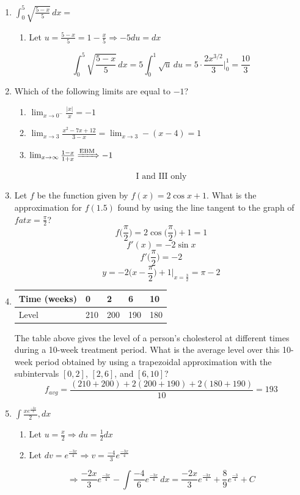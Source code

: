 \documentclass[12pt]{article}
\begin{document}
\begin{enumerate}
    \item $\int_0^5 \sqrt{\frac{5-x}{5}} \, dx = $
    \begin{enumerate}
        \item Let $u=\frac{5-x}{5} = 1-\frac{x}{5} \Longrightarrow -5du = dx$
    \end{enumerate}
    $$ \int_0^5 \sqrt{\frac{5-x}{5}} \, dx = 5\int_{0}^{1} \sqrt{u} \, du = 5 \cdot \frac{2x^{3/2}}{3} \bigg\rvert_{0}^{1} =\boxed{\frac{10}{3}}$$
    \item Which of the following limits are equal to $-1$?
        \begin{enumerate}[label=\Roman*.]
            \item $\lim_{x\to0^-} \frac{|x|}{x} = -1$
            \item $\lim_{x\to3} \frac{x^2-7x+12}{3-x} = \lim_{x\to3} - (x-4)=1 $
            \item $\lim_{x\to\infty} \frac{1-x}{1+x} \xRightarrow[]{\text{EBM}} -1$
        \end{enumerate}
        $$\boxed{\text{I and III only}}$$
    \item Let $f$ be the function given by $f(x) = 2\cos x + 1$. What is the approximation for $f(1.5)$ found by using the line tangent to the graph of $f at x=\frac{\pi}{2}$?
    $$f\big(\frac{\pi}{2}\big) =2\cos\big(\frac{\pi}{2}\big) +1 = 1$$
    $$f'(x)= -2\sin x$$
    $$f'(\frac{\pi}{2}\big)= -2$$
    $$y = -2\big(x-\frac{\pi}{2})+1 \bigg\rvert_{x=\frac{3}{2}} = \boxed{\pi -2}$$
    \item  
        \begin{table}[h!]
            \centering
            \begin{tabular}{|l||l|l|l|l|}
            \hline
                Time (weeks) & 0   & 2   & 6   & 10  \\ \hline
                Level        & 210 & 200 & 190 & 180 \\ \hline
                \end{tabular}
                \end{table}
    The table above gives the level of a person's cholesterol at different times during a 10-week treatment period. What is the average level over this 10-week period obtained by using a trapezoidal approximation with the subintervals $[0, 2]$, $[2, 6]$, and $[6, 10]$?
    $$f_{avg}= \frac{(210+200)+2(200+190)+2(180+190)}{10} = \boxed{193}$$
    \item $\int \frac{xe^{\frac{-3x}{4}}}{2}, dx$
    \begin{enumerate}
        \item Let $u=\frac{x}{2} \Longrightarrow du = \frac{1}{2} dx$
        \item Let $dv = e^{\frac{-3x}{4}} \Longrightarrow v= \frac{-4}{3}e^{\frac{-3x}{4}}$
    \end{enumerate}
    $$\Longrightarrow \frac{-2x}{3}e^{\frac{-3x}{4}} - \int \frac{-4}{6}e^{\frac{-3x}{4}} \, dx = \boxed{\frac{-2x}{3}e^{\frac{-3x}{4}} + \frac{8}{9}e^{\frac{-3}{4}}+C}$$


\end{enumerate}
\end{document}
